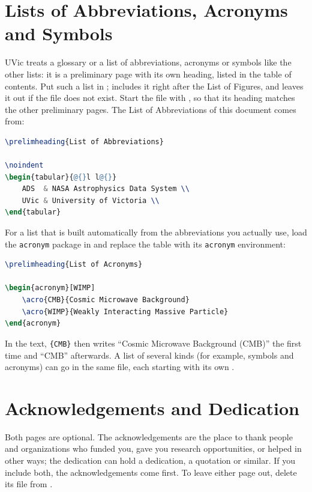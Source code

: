 \section{Lists of Abbreviations, Acronyms and Symbols}
\label{sec:abbreviations}

UVic treats a glossary or a list of abbreviations, acronyms or symbols like the other lists: it is a preliminary page with its own heading, listed in the table of contents. Put such a list in ;  includes it right after the List of Figures, and leaves it out if the file does not exist. Start the file with , so that its heading matches the other preliminary pages. The List of Abbreviations of this document comes from:
\begin{lstlisting}[language=TeX]
\prelimheading{List of Abbreviations}

\noindent
\begin{tabular}{@{}l l@{}}
    ADS  & NASA Astrophysics Data System \\
    UVic & University of Victoria \\
\end{tabular}
\end{lstlisting}
For a list that is built automatically from the abbreviations you actually use, load the \texttt{acronym} package in  and replace the table with its \texttt{acronym} environment:
\begin{lstlisting}[language=TeX]
\prelimheading{List of Acronyms}

\begin{acronym}[WIMP]
    \acro{CMB}{Cosmic Microwave Background}
    \acro{WIMP}{Weakly Interacting Massive Particle}
\end{acronym}
\end{lstlisting}
In the text, \texttt{\{CMB\}} then writes ``Cosmic Microwave Background (CMB)'' the first time and ``CMB'' afterwards. A list of several kinds (for example, symbols and acronyms) can go in the same file, each starting with its own .

\section{Acknowledgements and Dedication}
\label{sec:acknowledgements}

Both pages are optional. The acknowledgements are the place to thank people and organizations who funded you, gave you research opportunities, or helped in other ways; the dedication can hold a dedication, a quotation or similar. If you include both, the acknowledgements come first. To leave either page out, delete its file from .

